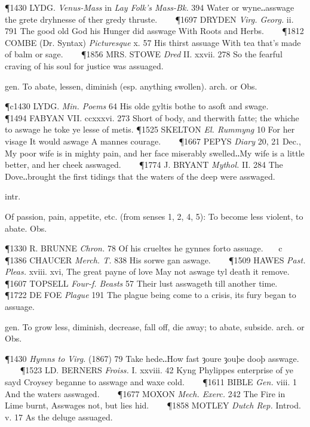 \begin{description}[wide, labelwidth=!, labelindent=0pt]
\begin{myenumerate}
\P 1430 LYDG.  \textit{Venus-Mass} in \textit{Lay Folk's Mass-Bk.} 394 Water or wyne‥asswage the grete dryhnesse of ther gredy thruste.    
\P 1697 DRYDEN  \textit{Virg. Georg.} ii. 791 The good old God his Hunger did asswage With Roots and Herbs.    
\P 1812 COMBE (Dr. Syntax) \textit{Picturesque} x. 57 His thirst assuage With tea that's made of balm or sage.    
\P 1856 MRS. STOWE  \textit{Dred} II. xxvii. 278 So the fearful craving of his soul for justice was assuaged.

 gen. To abate, lessen, diminish (esp. anything swollen). arch. or Obs.

\P c1430 LYDG.  \textit{Min. Poems} 64 His olde gyltis bothe to asoft and swage.    
\P 1494 FABYAN  VII. ccxxxvi. 273 Short of body, and therwith fatte; the whiche to aswage he toke ye lesse of metis.
\P 1525 SKELTON  \textit{El. Rummyng} 10 For her visage It would aswage A mannes courage.    
\P 1667 PEPYS  \textit{Diary} 20, 21 Dec., My poor wife is in mighty pain, and her face miserably swelled‥My wife is a little better, and her cheek asswaged.    
\P 1774 J. BRYANT  \textit{Mythol.} II. 284 The Dove‥brought the first tidings that the waters of the deep were asswaged.

 intr.

 Of passion, pain, appetite, etc. (from senses 1, 2, 4, 5): To become less violent, to abate. Obs.

\P 1330 R. BRUNNE  \textit{Chron.} 78 Of his crueltes he gynnes forto assuage.    c 
\P 1386 CHAUCER  \textit{Merch. T.} 838 His sorwe gan aswage.    
\P 1509 HAWES  \textit{Past. Pleas.} xviii. xvi, The great payne of love May not aswage tyl death it remove.    
\P 1607 TOPSELL  \textit{Four-f. Beasts} 57 Their lust asswageth till another time.    
\P 1722 DE FOE  \textit{Plague} 191 The plague being come to a crisis, its fury began to assuage.

 gen. To grow less, diminish, decrease, fall off, die away; to abate, subside. arch. or Obs.

\P 1430 \textit{Hymns  to Virg.} (1867) 79 Take hede‥How fast ȝoure ȝouþe dooþ asswage.    
\P 1523 LD. BERNERS  \textit{Froiss.} I. xxviii. 42 Kyng Phylippes enterprise of ye sayd Croysey beganne to asswage and waxe cold.    
\P 1611 BIBLE  \textit{Gen.} viii. 1 And the waters asswaged.    
\P 1677 MOXON  \textit{Mech. Exerc.} 242 The Fire in Lime burnt, Asswages not, but lies hid.    
\P 1858 MOTLEY  \textit{Dutch Rep.} Introd. v. 17 As the deluge assuaged.
\end{myenumerate}



\end{description}
